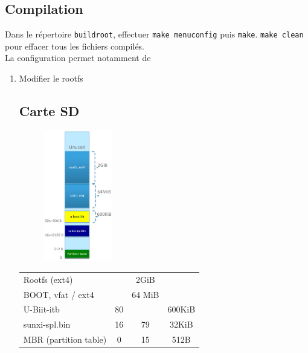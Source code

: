 \documentclass[resume]{subfiles}
\begin{document}
\subsection{Compilation}
Dans le répertoire \verb!buildroot!, effectuer \verb!make menuconfig! puis \verb!make!. \verb!make clean! pour effacer tous les fichiers compilés.\\
La configuration permet notamment de 
\begin{enumerate}
\item Modifier le rootfs
\subsection{Carte SD}
\begin{figure}[H]
\centering
\includegraphics[width=3.00cm]{img_2.png}
\end{figure}
\begin{center}
\begin{tabular}{lccc}
Rootfs (ext4) & & 2GiB\\
BOOT, vfat / ext4 & & 64 MiB\\
U-Biit-itb & 80 & & 600KiB\\
sunxi-spl.bin & 16 & 79 & 32KiB\\
MBR (partition table) & 0 & 15 & 512B
\end{tabular}
\end{center}





\end{enumerate}
\end{document}
